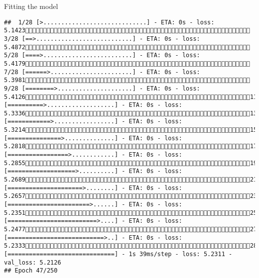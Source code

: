 \documentclass[
  ignorenonframetext,
]{beamer}
\begin{document}
\begin{frame}[fragile]{Fitting the model}
\begin{verbatim}
##  1/28 [>.............................] - ETA: 0s - loss: 5.1423 3/28 [==>...........................] - ETA: 0s - loss: 5.4872 5/28 [====>.........................] - ETA: 0s - loss: 5.4179 7/28 [======>.......................] - ETA: 0s - loss: 5.3981 9/28 [========>.....................] - ETA: 0s - loss: 5.412611/28 [==========>...................] - ETA: 0s - loss: 5.333613/28 [============>.................] - ETA: 0s - loss: 5.321415/28 [===============>..............] - ETA: 0s - loss: 5.281817/28 [=================>............] - ETA: 0s - loss: 5.285519/28 [===================>..........] - ETA: 0s - loss: 5.268921/28 [=====================>........] - ETA: 0s - loss: 5.265723/28 [=======================>......] - ETA: 0s - loss: 5.235125/28 [=========================>....] - ETA: 0s - loss: 5.247727/28 [===========================>..] - ETA: 0s - loss: 5.233328/28 [==============================] - 1s 39ms/step - loss: 5.2311 - val_loss: 5.2126
## Epoch 47/250

\end{verbatim}
\end{frame}
\end{document}
